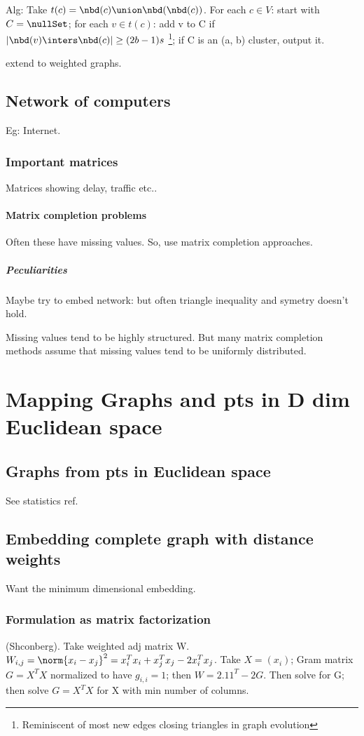 \documentclass[oneside, article]{memoir}
\begin{document}
Alg: Take $t(c) = \nbd(c) \union \nbd(\nbd(c))$. For each $c \in V$: start with $C=\nullSet$; for each $v\in t(c)$: add v to C if $|\nbd(v)\inters \nbd(c)| \geq (2b-1)s$ \footnote{Reminiscent of most new edges closing triangles in graph evolution}; if C is an (a, b) cluster, output it.

\oprob extend to weighted graphs.

\chapter{Network of computers}
Eg: Internet.

\section{Important matrices}
Matrices showing delay, traffic etc..

\subsection{Matrix completion problems}
Often these have missing values. So, use matrix completion approaches.

\subsubsection{Peculiarities}
Maybe try to embed network: but often triangle inequality and symetry doesn't hold.

Missing values tend to be highly structured. But many matrix completion methods assume that missing values tend to be uniformly distributed.

\part{Mapping Graphs and pts in D dim Euclidean space}
\chapter{Graphs from pts in Euclidean space}
See statistics ref.

\chapter{Embedding complete graph with distance weights}
Want the minimum dimensional embedding.

\section{Formulation as matrix factorization}
(Shconberg). Take weighted adj matrix W. $W_{i,j} = \norm{x_{i}-x_{j}}^{2} = x_{i}^{T}x_{i} + x_{j}^{T}x_{j} - 2x_{i}^{T}x_{j}$. Take $X = (x_{i})$; Gram matrix $G = X^{T}X$ normalized to have $g_{i,i} = 1$; then $W = 2.11^{T}-2G$. Then solve for G; then solve $G = X^{T}X$ for X with min number of columns.
\end{document}
